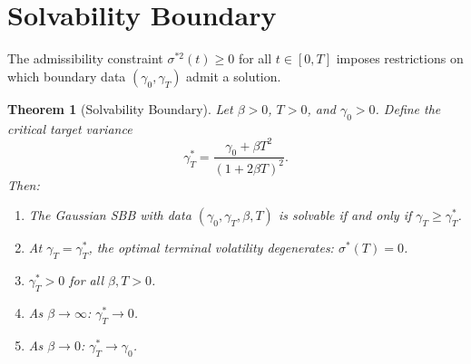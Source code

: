 \documentclass[12pt]{article}
\newtheorem{theorem}{Theorem}[section]
\theoremstyle{definition}
\begin{document}
\section{Solvability Boundary}\label{sec:solvability}

The admissibility constraint $\sigma^{*2}(t) \ge 0$ for all
$t \in [0,T]$ imposes restrictions on which boundary data
$(\gamma_0, \gamma_T)$ admit a solution.

\begin{theorem}[Solvability Boundary]\label{thm:solvability}
Let $\beta > 0$, $T > 0$, and $\gamma_0 > 0$.
Define the critical target variance
\begin{equation}\label{eq:critical}
\gamma_T^* = \frac{\gamma_0 + \beta T^2}{(1 + 2\beta T)^2}.
\end{equation}
Then:
\begin{enumerate}[label=(\alph*)]
\item The Gaussian SBB with data $(\gamma_0, \gamma_T, \beta, T)$
  is solvable if and only if $\gamma_T \ge \gamma_T^*$.

\item At $\gamma_T = \gamma_T^*$, the optimal terminal volatility
  degenerates: $\sigma^*(T) = 0$.

\item $\gamma_T^* > 0$ for all $\beta, T > 0$.

\item As $\beta \to \infty$: $\gamma_T^* \to 0$.

\item As $\beta \to 0$: $\gamma_T^* \to \gamma_0$.
\end{enumerate}
\end{theorem}
\end{document}
